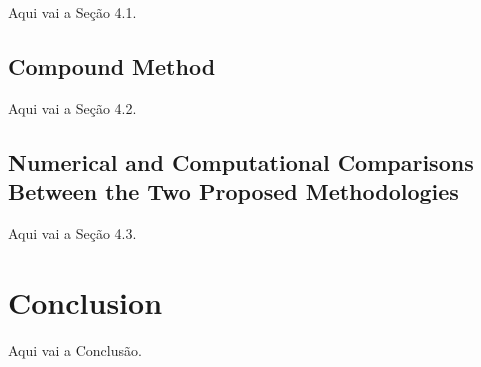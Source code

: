 \documentclass[journal,article,submit,pdftex,moreauthors]{Definitions/mdpi}
\begin{document}
Aqui vai a Seção 4.1.

\subsection{Compound Method}

Aqui vai a Seção 4.2.

\subsection{Numerical and Computational Comparisons Between the Two Proposed Methodologies}

Aqui vai a Seção 4.3.

\section{Conclusion}

Aqui vai a Conclusão.




\vspace{6pt} 



\end{document}
